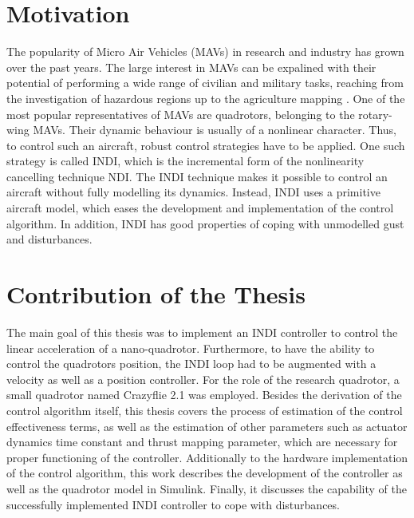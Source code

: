 \documentclass[11pt, a4paper, twoside]{report}
\begin{document}
\section{Motivation} \label{sec:motivation}

The popularity of Micro Air Vehicles (MAVs) in research and industry has grown over the past years. The large interest in \acrshort{MAV}s can be expalined with their potential of performing a wide range of civilian and military tasks, reaching from the investigation of hazardous regions up to the agriculture mapping \cite{Ward}. One of the most popular representatives of \acrshort{MAV}s are quadrotors, belonging to the rotary-wing \acrshort{MAV}s. Their dynamic behaviour is usually of a nonlinear character. Thus, to control such an aircraft, robust control strategies have to be applied. One such strategy is called \acrfull{INDI}, which is the incremental form of the nonlinearity cancelling technique \acrfull{NDI}. The \acrshort{INDI} technique makes it possible to control an aircraft without fully modelling its dynamics. Instead, \acrshort{INDI} uses a primitive aircraft model, which eases the development and implementation of the control algorithm. In addition, \acrshort{INDI} has good properties of coping with unmodelled gust and disturbances. 

\section{Contribution of the Thesis} \label{sec:contribution_ofthe_thesis}

The main goal of this thesis was to implement an \acrshort{INDI} controller to control the linear acceleration of a nano-quadrotor. Furthermore, to have the ability to control the quadrotors position, the \acrshort{INDI} loop had to be augmented with a velocity as well as a position controller. For the role of the research quadrotor, a small quadrotor named Crazyflie 2.1 was employed. Besides the derivation of the control algorithm itself, this thesis covers the process of estimation of the control effectiveness terms, as well as the estimation of other parameters such as actuator dynamics time constant and thrust mapping parameter, which are necessary for proper functioning of the controller. Additionally to the hardware implementation of the control algorithm, this work describes the development of the controller as well as the quadrotor model in Simulink. Finally, it discusses the capability of the successfully implemented \acrshort{INDI} controller to cope with disturbances. 
\end{document}
